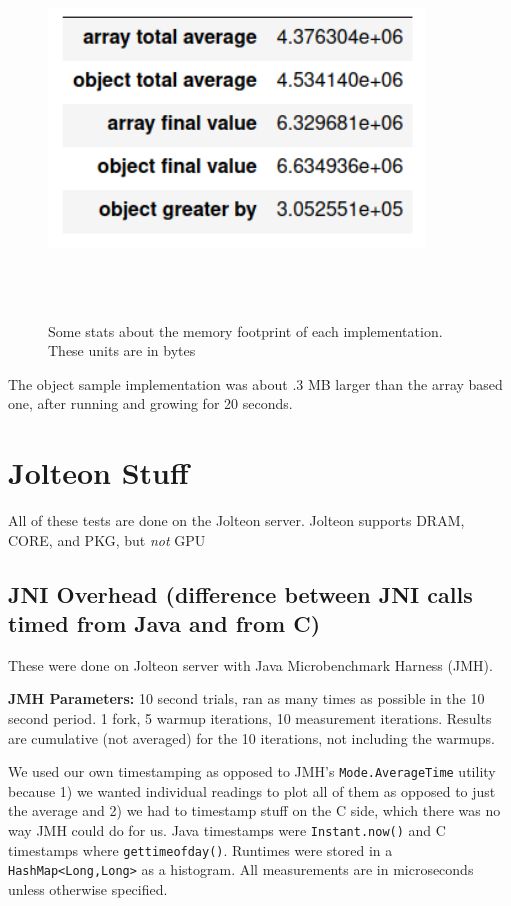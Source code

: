 \documentclass{article}
\begin{document}
    \begin{figure}[H]
    	\centering
    	\includegraphics[width=10cm,height=10cm,keepaspectratio]{MemoryFootprint/ArrayVsObjectStorage_(deprecated)/memory_consumption_table.png}
    	\caption{Some stats about the memory footprint of each implementation. These units are in bytes}
    	\label{fig:avg-sample-PKG}
    \end{figure}

    The object sample implementation was about .3 MB larger than the array based one, after running and growing
    for 20 seconds.


\section{Jolteon Stuff}
    All of these tests are done on the Jolteon server. Jolteon supports DRAM, CORE, and PKG, but \emph{not} GPU

    \subsection{JNI Overhead (difference between JNI calls timed from Java and from C)}
    These were done on Jolteon server with Java Microbenchmark Harness (JMH).
    
    \textbf{JMH Parameters:} 10 second trials, ran as many times as possible in the 10 second period. 1 fork, 5 warmup iterations, 10 measurement iterations. Results are cumulative (not averaged) for the 10 iterations, not including the warmups.
    
    We used our own timestamping as opposed to JMH's \texttt{Mode.AverageTime} utility because 1) we wanted individual readings to plot all of them as opposed to just the average and 2) we had to timestamp stuff on the C side, which there was no way JMH could do for us. Java timestamps were \texttt{Instant.now()} and C timestamps where \texttt{gettimeofday()}. Runtimes were stored in a \texttt{HashMap<Long,Long>} as a histogram. All measurements are in microseconds unless otherwise specified. 
    
\end{document}
